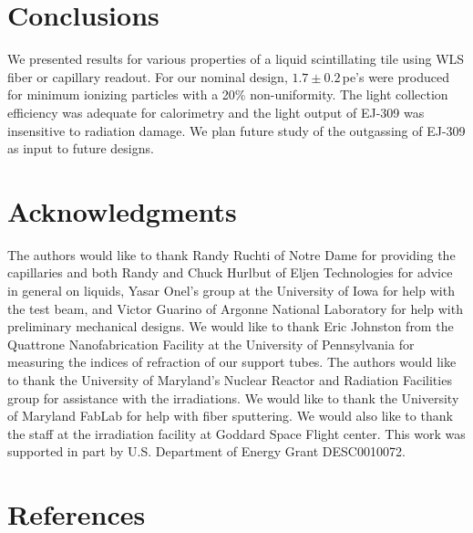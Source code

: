 \documentclass[review]{elsarticle}
\begin{document}
\section{Conclusions}

We presented results for various properties of a liquid scintillating tile using WLS fiber or capillary readout. For our nominal design, $1.7\pm 0.2$\,pe's
were produced for minimum ionizing particles with a 20\% non-uniformity.
The light collection efficiency was adequate for calorimetry and the light output of EJ-309 was insensitive to radiation damage.  We plan future
study of the outgassing of EJ-309 as input to future designs.


\section{Acknowledgments}
The authors would like to thank Randy Ruchti of Notre Dame for
providing the capillaries and both Randy and Chuck Hurlbut of Eljen
Technologies for
advice in general on liquids,
Yasar Onel's group at the University of
Iowa for help with the test beam, and Victor Guarino of Argonne National Laboratory for
help with preliminary mechanical designs.
We would like to thank Eric
Johnston from the Quattrone Nanofabrication Facility at the University
of Pennsylvania for measuring the indices of refraction of our support
tubes. 
The authors would like to thank 
the University of Maryland's Nuclear Reactor and Radiation
Facilities group for assistance
with the irradiations.
 We would like to thank the University of Maryland
FabLab for help with fiber sputtering.
We would also like to thank the staff at the irradiation facility at Goddard Space Flight center.
This work was supported in part by U.S. Department of Energy
Grant DESC0010072.

\section*{References}


\end{document}

